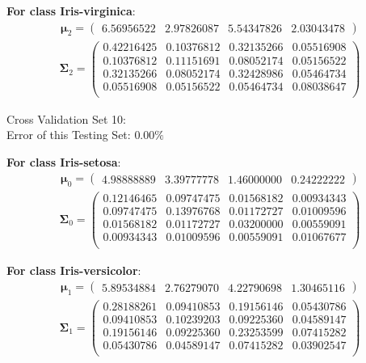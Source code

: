 \documentclass[11pt,a4paper]{article}
\newcommand{\htab}{\hspace*{0.63cm}}
\newcommand{\bs}[1]{\boldsymbol{#1}}
\begin{document}
\textbf{For class Iris-virginica}:
\begin{align} \bs{\mu}_{2} = \begin{pmatrix} 
6.56956522 & 2.97826087 & 5.54347826 & 2.03043478 
 \end{pmatrix}  \end{align} 
\vspace{-1cm}
\begin{align} \bs{\Sigma}_{2} = \begin{pmatrix} 
0.42216425 & 0.10376812 & 0.32135266 & 0.05516908 \\ 
0.10376812 & 0.11151691 & 0.08052174 & 0.05156522 \\ 
0.32135266 & 0.08052174 & 0.32428986 & 0.05464734 \\ 
0.05516908 & 0.05156522 & 0.05464734 & 0.08038647 \\ 
\end{pmatrix} \end{align}


Cross Validation Set 10: \\
\htab Error of this Testing Set: $0.00\%$ 

\textbf{For class Iris-setosa}:
\begin{align} \bs{\mu}_{0} = \begin{pmatrix} 
4.98888889 & 3.39777778 & 1.46000000 & 0.24222222 
 \end{pmatrix}  \end{align} 
\vspace{-1cm}
\begin{align} \bs{\Sigma}_{0} = \begin{pmatrix} 
0.12146465 & 0.09747475 & 0.01568182 & 0.00934343 \\ 
0.09747475 & 0.13976768 & 0.01172727 & 0.01009596 \\ 
0.01568182 & 0.01172727 & 0.03200000 & 0.00559091 \\ 
0.00934343 & 0.01009596 & 0.00559091 & 0.01067677 \\ 
\end{pmatrix} \end{align}

\textbf{For class Iris-versicolor}:
\begin{align} \bs{\mu}_{1} = \begin{pmatrix} 
5.89534884 & 2.76279070 & 4.22790698 & 1.30465116 
 \end{pmatrix}  \end{align} 
\vspace{-1cm}
\begin{align} \bs{\Sigma}_{1} = \begin{pmatrix} 
0.28188261 & 0.09410853 & 0.19156146 & 0.05430786 \\ 
0.09410853 & 0.10239203 & 0.09225360 & 0.04589147 \\ 
0.19156146 & 0.09225360 & 0.23253599 & 0.07415282 \\ 
0.05430786 & 0.04589147 & 0.07415282 & 0.03902547 \\ 
\end{pmatrix} \end{align}
\end{document}
